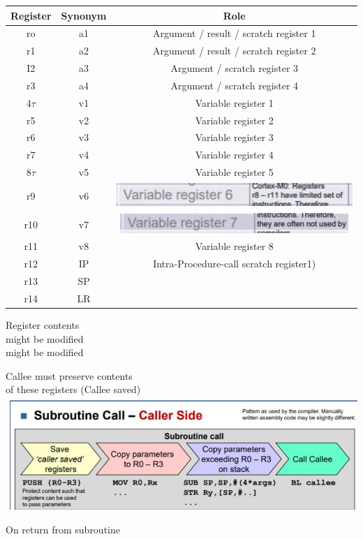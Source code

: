 \begin{center}
\begin{tabular}{|c|c|c|}
\hline
Register & Synonym & Role \\
\hline
ro & a1 & Argument / result / scratch register 1 \\
\hline
r1 & a2 & Argument / result / scratch register 2 \\
\hline
I2 & a3 & Argument / scratch register 3 \\
\hline
r3 & a4 & Argument / scratch register 4 \\
\hline
4$\tau$ & v1 & Variable register 1 \\
\hline
r5 & v2 & Variable register 2 \\
\hline
r6 & v3 & Variable register 3 \\
\hline
r7 & v4 & Variable register 4 \\
\hline
8$\tau$ & v5 & Variable register 5 \\
\hline
r9 & v6 & \includegraphics[width=\linewidth]{images/2024_12_29_79e6b22f503fb7b4f718g-09}
 \\
\hline
r10 & v7 & \includegraphics[width=\linewidth]{images/2024_12_29_79e6b22f503fb7b4f718g-09(1)}
 \\
\hline
r11 & v8 & Variable register 8 \\
\hline
r12 & IP & Intra-Procedure-call scratch register1) \\
\hline
r13 & SP &  \\
\hline
r14 & LR &  \\
\hline
\end{tabular}
\end{center}

Register contents\\
might be modified\\
might be modified

Callee must preserve contents\\
of these registers (Callee saved)\\
\includegraphics[width=\linewidth]{images/2024_12_29_79e6b22f503fb7b4f718g-09(3)}

On return from subroutine